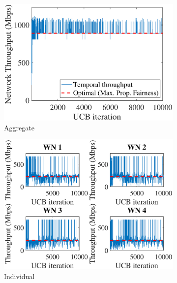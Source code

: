 \documentclass[preprint,12pt]{elsarticle}
\begin{document}
\begin{figure}
	\centering
	\begin{subfigure}[b]{.3\textwidth}
		\includegraphics[width=\textwidth]{images/NEW_temporal_aggregate_tpt_UCB}
		\caption{Aggregate}\label{fig:ucb_agg_tpt}
	\end{subfigure}
	\begin{subfigure}[b]{.3\textwidth}
		\includegraphics[width=\textwidth]{images/NEW_temporal_individual_tpt_UCB}
		\caption{Individual}\label{fig:ucb_tpt_evolution}
	\end{subfigure}
	\begin{subfigure}[b]{.3\textwidth}

\end{subfigure}
\end{figure}
\end{document}
